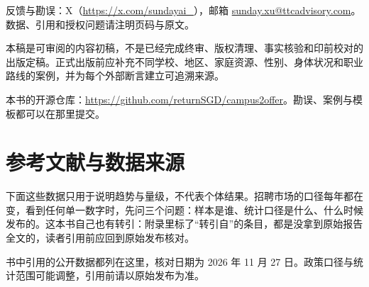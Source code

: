 \documentclass[UTF8,zihao=5,openany]{ctexbook}
\begin{document}
{\sloppy 反馈与勘误：X（\url{https://x.com/sundayai_}），邮箱 \url{sunday.xu@ttcadvisory.com}。数据、引用和授权问题请注明页码与原文。\par}

\begin{warningbox}
本稿是可审阅的内容初稿，不是已经完成终审、版权清理、事实核验和印前校对的出版定稿。正式出版前应补充不同学校、地区、家庭资源、性别、身体状况和职业路线的案例，并为每个外部断言建立可追溯来源。
\end{warningbox}

本书的开源仓库：\url{https://github.com/returnSGD/campus2offer}。勘误、案例与模板都可以在那里提交。

\section{参考文献与数据来源}

\begin{warningbox}
下面这些数据只用于说明趋势与量级，不代表个体结果。招聘市场的口径每年都在变，看到任何单一数字时，先问三个问题：样本是谁、统计口径是什么、什么时候发布的。这本书自己也有转引：附录里标了“转引自”的条目，都是没拿到原始报告全文的，读者引用前应回到原始发布核对。
\end{warningbox}

书中引用的公开数据都列在这里，核对日期为 2026 年 11 月 27 日。政策口径与统计范围可能调整，引用前请以原始发布为准。
\end{document}

